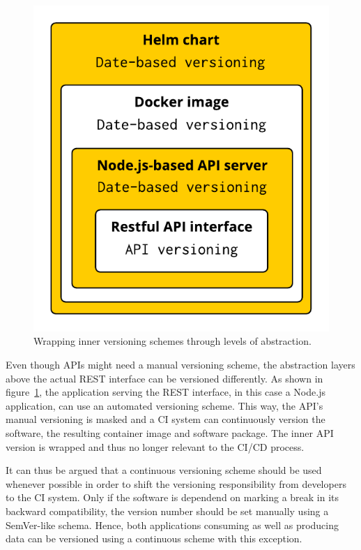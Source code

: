 \begin{figure}[H]
\begin{center}
  \includegraphics[scale=0.7]{images/figures/version_wrapping.pdf}
\end{center}
\caption{Wrapping inner versioning schemes through levels of abstraction.}%
\label{fig:version_wrapping}
\end{figure}

Even though \acp{API} might need a manual versioning scheme, the abstraction
layers above the actual \ac{REST} interface can be versioned differently. As
shown in figure~\ref{fig:version_wrapping}, the application serving the
\ac{REST} interface, in this case a Node.js application, can use an automated
versioning scheme. This way, the \ac{API}'s manual versioning is masked and a
\ac{CI} system can continuously version the software, the resulting container
image and software package. The inner \ac{API} version is wrapped and thus no
longer relevant to the \ac{CI}/\ac{CD} process.

It can thus be argued that a continuous versioning scheme should be used
whenever possible in order to shift the versioning responsibility from
developers to the \ac{CI} system. Only if the software is dependend on marking
a break in its backward compatibility, the version number should be set
manually using a SemVer-like schema. Hence, both applications consuming as well
as producing data can be versioned using a continuous scheme with this
exception.


